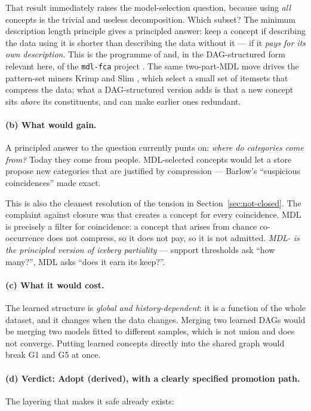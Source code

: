 That result immediately raises the model-selection question, because using
\emph{all} concepts is the trivial and useless decomposition. Which subset?
The minimum description length principle \citep{rissanen1978,grunwald2007}
gives a principled answer: keep a concept if describing the data using it is
shorter than describing the data without it --- if it \emph{pays for its own
description}. This is the programme of \citet{miettinen2014} and, in the
DAG-structured form relevant here, of the \texttt{mdl-fca} project
\citep{mdlfca}. The same two-part-MDL move drives the pattern-set miners
Krimp and Slim \citep{vreeken2011,smets2012}, which select a small set of
itemsets that compress the data; what a DAG-structured version adds is that
a new concept sits \emph{above} its constituents, and can make earlier ones
redundant.

\paragraph{(b) What \odag{} would gain.} A principled answer to the question
\odag{} currently punts on: \emph{where do categories come from?} Today they
come from people. MDL-selected concepts would let a store propose new
categories that are justified by compression --- Barlow's ``suspicious
coincidences'' \citep{barlow1989} made exact.

This is also the cleanest resolution of the tension in
Section~\ref{sec:not-closed}. The complaint against closure was that \fca{}
creates a concept for every coincidence. MDL is precisely a filter for
coincidence: a concept that arises from chance co-occurrence does not
compress, so it does not pay, so it is not admitted. \emph{MDL-\fca{} is the
principled version of iceberg partiality} --- support thresholds ask ``how
many?'', MDL asks ``does it earn its keep?''.

\paragraph{(c) What it would cost.} The learned structure is \emph{global and
history-dependent}: it is a function of the whole dataset, and it changes when
the data changes. Merging two learned DAGs would be merging two models fitted
to different samples, which is not union and does not converge. Putting
learned concepts directly into the shared graph would break G1 and G5 at once.

\paragraph{(d) Verdict: \textbf{Adopt (derived)}, with a clearly specified
promotion path.} The layering that makes it safe already exists:


